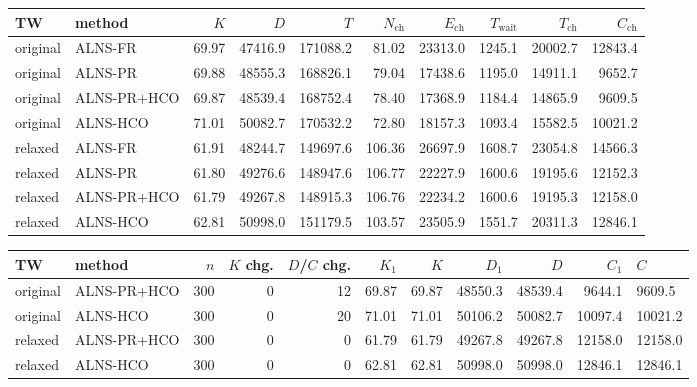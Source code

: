 \begin{tabular}{llrrrrrrrr}
\toprule
TW & method & $K$ & $D$ & $T$ & $N_{\mathrm{ch}}$ & $E_{\mathrm{ch}}$ & $T_{\mathrm{wait}}$ & $T_{\mathrm{ch}}$ & $C_{\mathrm{ch}}$ \\
\midrule
original & ALNS-FR & 69.97 & 47416.9 & 171088.2 & 81.02 & 23313.0 & 1245.1 & 20002.7 & 12843.4 \\
original & ALNS-PR & 69.88 & 48555.3 & 168826.1 & 79.04 & 17438.6 & 1195.0 & 14911.1 & 9652.7 \\
original & ALNS-PR+HCO & 69.87 & 48539.4 & 168752.4 & 78.40 & 17368.9 & 1184.4 & 14865.9 & 9609.5 \\
original & ALNS-HCO & 71.01 & 50082.7 & 170532.2 & 72.80 & 18157.3 & 1093.4 & 15582.5 & 10021.2 \\
relaxed & ALNS-FR & 61.91 & 48244.7 & 149697.6 & 106.36 & 26697.9 & 1608.7 & 23054.8 & 14566.3 \\
relaxed & ALNS-PR & 61.80 & 49276.6 & 148947.6 & 106.77 & 22227.9 & 1600.6 & 19195.6 & 12152.3 \\
relaxed & ALNS-PR+HCO & 61.79 & 49267.8 & 148915.3 & 106.76 & 22234.2 & 1600.6 & 19195.3 & 12158.0 \\
relaxed & ALNS-HCO & 62.81 & 50998.0 & 151179.5 & 103.57 & 23505.9 & 1551.7 & 20311.3 & 12846.1 \\
\bottomrule
\end{tabular}

\begin{tabular}{llrrrrrrrrl}
\toprule
TW & method & $n$ & $K$ chg. & $D$/$C$ chg. & $K_1$ & $K$ & $D_1$ & $D$ & $C_1$ & $C$ \\
\midrule
original & ALNS-PR+HCO & 300 & 0 & 12 & 69.87 & 69.87 & 48550.3 & 48539.4 & 9644.1 & 9609.5 \\
original & ALNS-HCO & 300 & 0 & 20 & 71.01 & 71.01 & 50106.2 & 50082.7 & 10097.4 & 10021.2 \\
relaxed & ALNS-PR+HCO & 300 & 0 & 0 & 61.79 & 61.79 & 49267.8 & 49267.8 & 12158.0 & 12158.0 \\
relaxed & ALNS-HCO & 300 & 0 & 0 & 62.81 & 62.81 & 50998.0 & 50998.0 & 12846.1 & 12846.1 \\
\bottomrule
\end{tabular}
